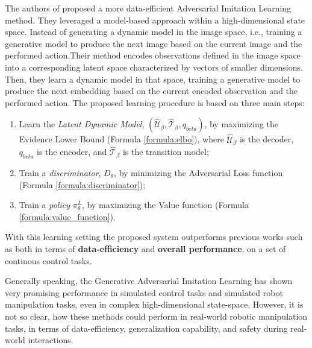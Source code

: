 The authors of \cite{rafailov2021visual_ail} proposed a more data-efficient Adversarial Imitation Learning method. They leveraged a model-based approach within a high-dimensional state space. Instead of generating a dynamic model in the image space, i.e., training a generative model to produce the next image based on the current image and the performed action.Their method encodes observations defined in the image space into a corresponding latent space characterized by vectors of smaller dimensions. Then, they learn a dynamic model in that space, training a generative model to produce the next embedding based on the current encoded observation and the performed action. The proposed learning procedure is based on three main steps:
\begin{enumerate}[label=\arabic*.]
    \item Learn the \textit{Latent Dynamic Model}, $(\hat{\mathcal{U}}_{\beta},\hat{\mathcal{T}}_{\beta}, q_{beta})$, by maximizing the Evidence Lower Bound (Formula \ref{formula:elbo}), where $\hat{\mathcal{U}}_{\beta}$ is the decoder, $q_{beta}$ is the encoder, and $\hat{\mathcal{T}}_{\beta}$ is the transition model;
    \item Train a \textit{discriminator}, $D_{\theta}$, by minimizing the Adversarial Loss function (Formula \ref{formula:discriminator});
    \item Train a \textit{policy} $\pi^{L}_{\theta}$, by maximizing the Value function (Formula \ref{formula:value_function}).
\end{enumerate}

With this learning setting the proposed system outperforms previous works such as \cite{reddy2019sqil,kostrikov2018discriminator} both in terms of \textbf{data-efficiency} and \textbf{overall performance}, on a set of continous control tasks.
% 

Generally speaking, the Generative Adversarial Imitation Learning has shown very promising performance in simulated control tasks and simulated robot manipulation tasks, even in complex high-dimensional state-space. However, it is not so clear, how these methods could perform in real-world robotic manipulation tasks, in terms of data-efficiency, generalization capability, and safety during real-world interactions. 